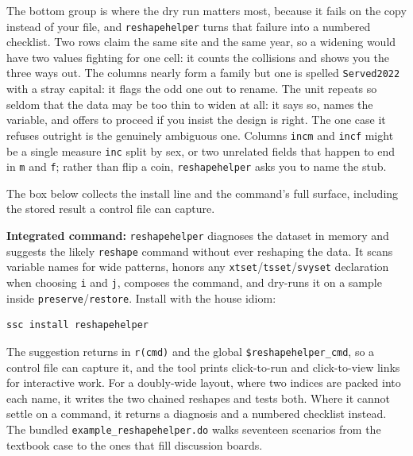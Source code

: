 The bottom group is where the dry run matters most, because it fails on the copy instead of your file, and \texttt{reshapehelper} turns that failure into a numbered checklist. Two rows claim the same site and the same year, so a widening would have two values fighting for one cell: it counts the collisions and shows you the three ways out. The columns nearly form a family but one is spelled \texttt{Served2022} with a stray capital: it flags the odd one out to rename. The unit repeats so seldom that the data may be too thin to widen at all: it says so, names the variable, and offers to proceed if you insist the design is right. The one case it refuses outright is the genuinely ambiguous one. Columns \texttt{incm} and \texttt{incf} might be a single measure \texttt{inc} split by sex, or two unrelated fields that happen to end in \texttt{m} and \texttt{f}; rather than flip a coin, \texttt{reshapehelper} asks you to name the stub.

The box below collects the install line and the command's full surface, including the stored result a control file can capture.

\begin{kaobox}[frametitle=Package Integration: \texttt{reshapehelper}]
\textbf{Integrated command:} \texttt{reshapehelper} diagnoses the dataset in memory and suggests the likely \texttt{reshape} command without ever reshaping the data. It scans variable names for wide patterns, honors any \texttt{xtset}/\texttt{tsset}/\texttt{svyset} declaration when choosing \texttt{i} and \texttt{j}, composes the command, and dry-runs it on a sample inside \texttt{preserve}/\texttt{restore}. Install with the house idiom:
\par
{\footnotesize
\begin{verbatim}
ssc install reshapehelper
\end{verbatim}
}
The suggestion returns in \texttt{r(cmd)} and the global \texttt{\$reshapehelper\_cmd}, so a control file can capture it, and the tool prints click-to-run and click-to-view links for interactive work. For a doubly-wide layout, where two indices are packed into each name, it writes the two chained reshapes and tests both. Where it cannot settle on a command, it returns a diagnosis and a numbered checklist instead. The bundled \texttt{example\_reshapehelper.do} walks seventeen scenarios from the textbook case to the ones that fill discussion boards.
\end{kaobox}


